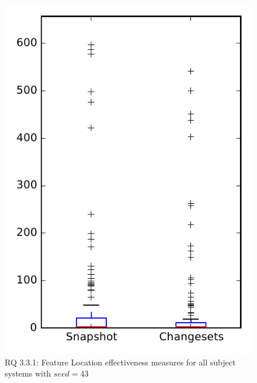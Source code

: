 
\begin{figure}
\centering
\includegraphics[height=0.4\textheight]{figures/flt_seed/rq1_overview_43}
\caption{RQ 3.3.1: Feature Location effectiveness measures for all subject systems with $seed=43$}
\label{fig:flt_seed:rq1:overview}
\end{figure}
